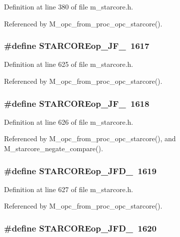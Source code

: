 Definition at line 380 of file m\_\-starcore.h.

Referenced by M\_\-opc\_\-from\_\-proc\_\-opc\_\-starcore().
\subsubsection{\setlength{\rightskip}{0pt plus 5cm}\#define STARCOREop\_\-JF\_~1617}\label{m__starcore_8h_36022a4897e521ebbac49af4d83c7c59}




Definition at line 625 of file m\_\-starcore.h.

Referenced by M\_\-opc\_\-from\_\-proc\_\-opc\_\-starcore().
\subsubsection{\setlength{\rightskip}{0pt plus 5cm}\#define STARCOREop\_\-JF\_~1618}\label{m__starcore_8h_12806fb037827628910a9245c5282c27}




Definition at line 626 of file m\_\-starcore.h.

Referenced by M\_\-opc\_\-from\_\-proc\_\-opc\_\-starcore(), and M\_\-starcore\_\-negate\_\-compare().
\subsubsection{\setlength{\rightskip}{0pt plus 5cm}\#define STARCOREop\_\-JFD\_~1619}\label{m__starcore_8h_3b3c928c9673fe5f17512cb427709c9e}




Definition at line 627 of file m\_\-starcore.h.

Referenced by M\_\-opc\_\-from\_\-proc\_\-opc\_\-starcore().
\subsubsection{\setlength{\rightskip}{0pt plus 5cm}\#define STARCOREop\_\-JFD\_~1620}\label{m__starcore_8h_787e1848271acbb562a264416bc3c848}




